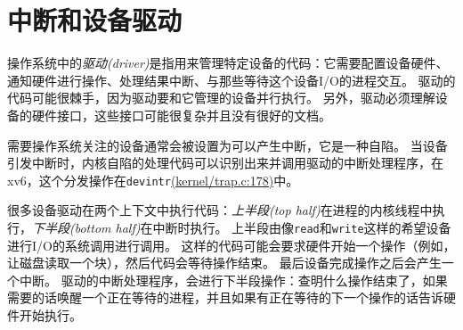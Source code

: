 \chapter{中断和设备驱动}

操作系统中的\emph{驱动(driver)}是指用来管理特定设备的代码：它需要配置设备硬件、通知硬件进行操作、处理结果中断、与那些等待这个设备I/O的进程交互。
驱动的代码可能很棘手，因为驱动要和它管理的设备并行执行。
另外，驱动必须理解设备的硬件接口，这些接口可能很复杂并且没有很好的文档。

需要操作系统关注的设备通常会被设置为可以产生中断，它是一种自陷。
当设备引发中断时，内核自陷的处理代码可以识别出来并调用驱动的中断处理程序，在xv6，这个分发操作在\texttt{devintr}\href{https://github.com/mit-pdos/xv6-riscv/blob/riscv//kernel/trap.c#L178}{(kernel/trap.c:178)}中。

很多设备驱动在两个上下文中执行代码：\emph{上半段(top half)}在进程的内核线程中执行，\emph{下半段(bottom half)}在中断时执行。
上半段由像\texttt{read}和\texttt{write}这样的希望设备进行I/O的系统调用进行调用。
这样的代码可能会要求硬件开始一个操作（例如，让磁盘读取一个块），然后代码会等待操作结束。
最后设备完成操作之后会产生一个中断。
驱动的中断处理程序，会进行下半段操作：查明什么操作结束了，如果需要的话唤醒一个正在等待的进程，并且如果有正在等待的下一个操作的话告诉硬件开始执行。


